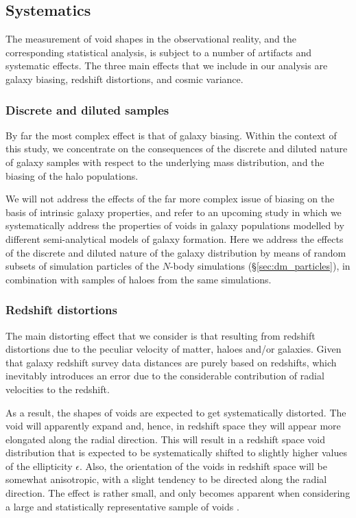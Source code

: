 \subsection{Systematics}
\label{sec:error}
The measurement of void shapes in the observational reality, and the corresponding statistical analysis, is subject to a 
number of artifacts and systematic effects. The three main effects that we include in our analysis are galaxy biasing, 
redshift distortions, and cosmic variance. 

\subsubsection{Discrete and diluted samples}
\label{sec:biasing}
By far the most complex effect is that of galaxy biasing. Within the context of this study, we concentrate 
on the consequences of the discrete and diluted nature of galaxy samples with respect to the underlying 
mass distribution, and the biasing of the halo populations. 

We will not address the effects of the far more complex issue of biasing on the basis of 
intrinsic galaxy properties, and refer to an upcoming study in which we systematically address the 
properties of voids in galaxy populations modelled by different semi-analytical models of galaxy 
formation. Here we address the effects of the discrete and diluted nature of the galaxy distribution 
by means of random subsets of simulation particles of the $N$-body simulations (\S\ref{sec:dm_particles}), 
in combination with samples of haloes from the same simulations. 

\subsubsection{Redshift distortions}
\label{sec:zspace}
The main distorting effect that we consider is that resulting from redshift distortions due to the peculiar velocity of 
matter, haloes and/or galaxies. Given that galaxy redshift survey data distances are purely based on redshifts, 
which inevitably introduces an error due to the considerable contribution of radial velocities to the redshift. 

As a result, the shapes of voids are expected to get systematically distorted. 
The void will apparently expand and, hence, 
in redshift space they will appear more elongated along the radial direction. This will result in a 
redshift space void distribution that is expected to be systematically shifted to slightly higher values of 
the ellipticity $\epsilon$. Also, the orientation of the voids in redshift space will be somewhat anisotropic, with 
a slight tendency to be directed along the radial direction. The effect is rather small, and only becomes 
apparent when considering a large and statistically representative sample of voids \citep[for a thorough recent analytical 
treatment, see][]{shoji12}. 

